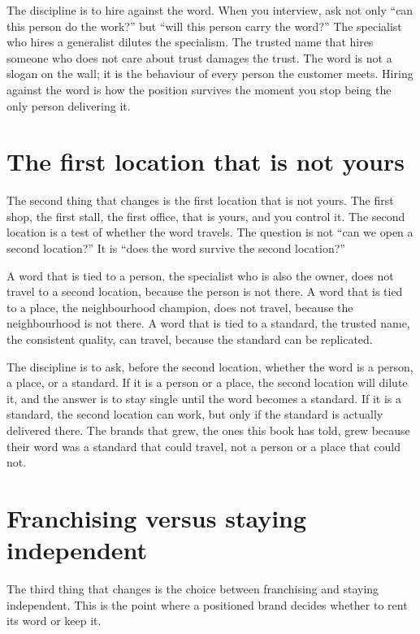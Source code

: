 \documentclass[10pt,twoside,openany]{memoir}
\newcommand{\needspacehead}{\needspace{4\baselineskip}}
\let\oldsection\section
\renewcommand{\section}{\needspacehead\oldsection}
\begin{document}
{{The discipline is to hire against the word. When you interview, ask not
only ``can this person do the work?'' but ``will this person carry the
word?'' The specialist who hires a generalist dilutes the specialism.
The trusted name that hires someone who does not care about trust
damages the trust. The word is not a slogan on the wall; it is the
behaviour of every person the customer meets. Hiring against the word is
how the position survives the moment you stop being the only person
delivering it.

\section{The first location that is not
yours}\label{the-first-location-that-is-not-yours}

The second thing that changes is the first location that is not yours.
The first shop, the first stall, the first office, that is yours, and
you control it. The second location is a test of whether the word
travels. The question is not ``can we open a second location?'' It is
``does the word survive the second location?''

A word that is tied to a person, the specialist who is also the owner,
does not travel to a second location, because the person is not there. A
word that is tied to a place, the neighbourhood champion, does not
travel, because the neighbourhood is not there. A word that is tied to a
standard, the trusted name, the consistent quality, can travel, because
the standard can be replicated.

The discipline is to ask, before the second location, whether the word
is a person, a place, or a standard. If it is a person or a place, the
second location will dilute it, and the answer is to stay single until
the word becomes a standard. If it is a standard, the second location
can work, but only if the standard is actually delivered there. The
brands that grew, the ones this book has told, grew because their word
was a standard that could travel, not a person or a place that could
not.

\section{Franchising versus staying
independent}\label{franchising-versus-staying-independent}

The third thing that changes is the choice between franchising and
staying independent. This is the point where a positioned brand decides
whether to rent its word or keep it.

}}
\end{document}
